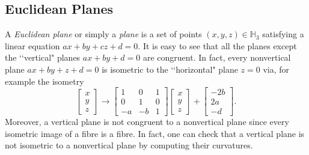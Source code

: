 \documentclass[11pt]{amsart}
\begin{document}
\subsection{Euclidean Planes} A {\it Euclidean plane} or simply a
{\it plane} is a set of points $(x, y, z)\in{\mathbb{H}}_3$ satisfying a
linear equation $ax+by+cz+d=0.$ It is easy to see that all the
planes except the \lq\lq vertical" planes $ax+by+d=0$ are
congruent.  In fact, every nonvertical plane $ax+by+z+d=0$ is
isometric to the \lq\lq horizontal" plane $z=0$ via, for example
the isometry
$$\left[\begin{array}{c}x\\y\\z\end{array}\right]\rightarrow
\left[\begin{array}{rrr}1&0&1\\0&1&0\\-a&-b&1\end{array}\right]\left[\begin{array}{c}x\\y\\z\end{array}\right]+
\left[\begin{array}{r}-2b\\2a\\-d\end{array}\right].$$ Moreover, a
vertical plane is not congruent to a nonvertical plane since every
isometric image of a fibre is a fibre. In fact, one can check that
a vertical plane is not isometric to a nonvertical plane by
computing their curvatures.
\end{document}
